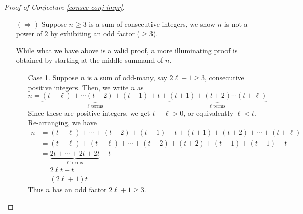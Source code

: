 \begin{example}
\vspace*{0.5em}

\begin{proof}[Proof of Conjecture \ref{consec-conj-impr}]\hfill
\begin{itemize}[itemsep=2em]
\item[$(\Rightarrow)$] Suppose $n \geq 3$ is a sum of consecutive integers, we show $n$ is not a power of $2$ by exhibiting an odd factor ($\geq 3$).\\
\vspace*{0.5em}
While what we have above is a valid proof, a more illuminating proof is obtained by starting at the middle summand of $n$.
\begin{itemize}[leftmargin=4em]
\item[Case 1.] Suppose $n$ is a sum of odd-many, say $2\ell + 1 \geq 3$, consecutive positive integers. Then, we write $n$ as
\[n = \underbrace{(t - \ell) + \cdots (t - 2) + (t - 1)}_{\text{$\ell$ terms}} + t + \underbrace{(t + 1) + (t + 2) \cdots (t + \ell)}_{\text{$\ell$ terms}}\]
Since these are positive integers, we get $t - \ell > 0$, or equivalently $\ell < t$.
Re-arranging, we have
\begin{align*}
n &= (t - \ell) + \cdots + (t - 2) + (t - 1) + t + (t + 1) + (t + 2) + \cdots + (t + \ell)\\[0.5em]
 &= (t - \ell) + (t + \ell) + \cdots + (t - 2) + (t + 2) + (t - 1) + (t + 1) + t\\[0.5em]
 &= \underbrace{2t + \cdots + 2t + 2t}_{\text{$\ell$ terms}} + t\\[0.5em]
 &= 2\ell t + t\\[0.5em]
 &= (2\ell + 1)t
\end{align*}
Thus $n$ has an odd factor $2\ell + 1 \geq 3$.


\end{itemize}
\end{itemize}
\end{proof}
\end{example}
